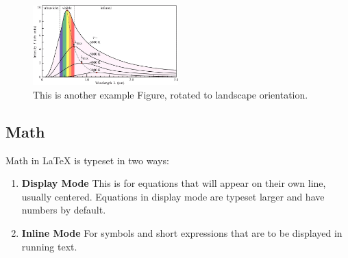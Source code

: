   \begin{figure}
    \centering
    \includegraphics[width=0.5\textwidth]{figures/exampleFigure.png}
    \caption[Sideways Example Figure]{This is another example Figure, rotated to landscape orientation.}
    \label{LandscapeFigure}
  \end{figure}

\subsection{Math}

Math in \LaTeX{} is typeset in two ways: 
\begin{enumerate}
  \item \textbf{Display Mode} This is for equations that will appear on their own line, usually centered.
  Equations in display mode are typeset larger and have numbers by default.
  \item \textbf{Inline Mode} For symbols and short expressions that are to be displayed in running text.
\end{enumerate}

